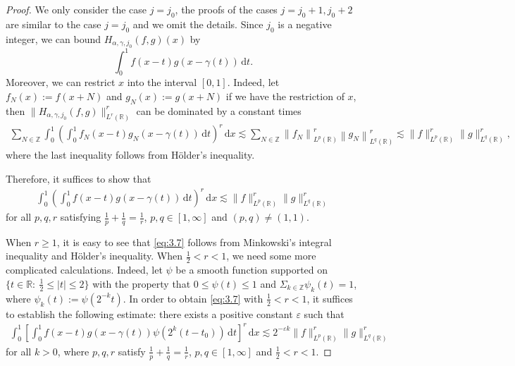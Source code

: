 \documentclass[11pt, twoside, leqno]{article}
\theoremstyle{definition}
\numberwithin{equation}{section}
\begin{document}
\begin{proof}
We only consider the case $j= j_0$, the proofs of the cases $j=j_0+1, j_0+2$ are similar to the case $j= j_0$ and we omit the details. Since $j_0$ is a negative integer, we can bound $H_{\alpha,\gamma,j_0}(f,g)(x)$ by
$$\int_{0}^{1}f(x-t)g(x-\gamma(t))\,\textrm{d}t.$$
Moreover, we can restrict $x$ into the interval $[0,1]$. Indeed, let $f_N(x):=f(x+N)$ and $g_N(x):=g(x+N)$ if we have the restriction of $x$, then $\|H_{\alpha,\gamma,j_0}(f,g)\|^r_{L^{r}(\mathbb{R})}$ can be dominated by a constant times
\begin{align*}
\sum\limits_{N\in\mathbb{Z}}\int_{0}^{1}\left(\int_{0}^{1}f_N(x-t)g_N(x-\gamma(t))\,\textrm{d}t\right)^r\,\textrm{d}x
\lesssim \sum_{N\in\mathbb{Z}}\left\|f_{N}\right\|_{L^{p}(\mathbb{R})}^{r}\left\|g_{N}\right\|_{L^{q}(\mathbb{R})}^{r}
\lesssim \|f\|_{L^{p}(\mathbb{R})}^{r}\|g\|_{L^{q}(\mathbb{R})}^{r},
\end{align*}
where the last inequality follows from H\"{o}lder's inequality.

Therefore, it suffices to show that
\begin{align}\label{eq:3.7}
\int_{0}^{1}\left(\int_{0}^{1}f(x-t)g(x-\gamma(t))\,\textrm{d}t\right)^r\,\textrm{d}x\lesssim \|f\|_{L^{p}(\mathbb{R})}^{r}\|g\|_{L^{q}(\mathbb{R})}^{r}
\end{align}
for all $p,q,r$ satisfying $\frac{1}{p}+\frac{1}{q}=\frac{1}{r}$, $p, q \in [1, \infty]$ and $(p,q)\neq (1,1)$.

When $r\geq1$, it is easy to see that \eqref{eq:3.7} follows from Minkowski's integral inequality and H\"{o}lder's inequality. When $\frac{1}{2}<r<1$, we need some more complicated calculations. Indeed, let $\psi$ be a smooth function supported on $\{t\in \mathbb{R}:\ \frac{1}{2}\leq |t|\leq 2\}$ with the property that $0\leq \psi(t)\leq 1$ and $\Sigma_{k\in \mathbb{Z}} \psi_k(t)=1$, where $\psi_k(t):=\psi (2^{-k}t)$. In order to obtain \eqref{eq:3.7} with $\frac{1}{2}<r<1$, it suffices to establish the following estimate: there exists a positive constant $\varepsilon$ such that
\begin{align}\label{eq:3.8}
\int_{0}^{1}\left[\int_{0}^{1}f(x-t)g(x-\gamma(t))\psi\left(2^{k}(t-t_{0})\right)\,\textrm{d}t\right]^r\,\textrm{d}x\lesssim 2^{-\varepsilon k}\|f\|_{L^{p}(\mathbb{R})}^{r}\|g\|_{L^{q}(\mathbb{R})}^{r}
\end{align}
for all $k>0$, where $p,q,r$ satisfy $\frac{1}{p}+\frac{1}{q}=\frac{1}{r}$, $p, q \in [1, \infty]$ and $\frac{1}{2}<r<1$.


\end{proof}
\end{document}
